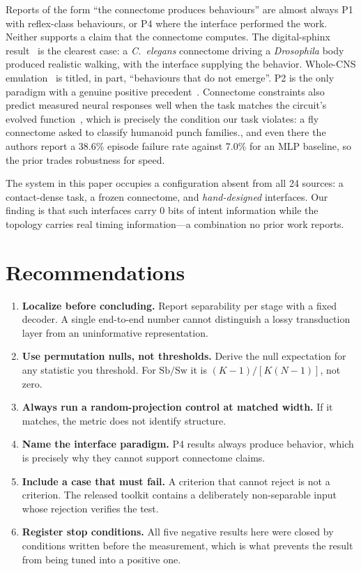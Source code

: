 \documentclass[11pt]{article}
\begin{document}
Reports of the form ``the connectome produces behaviours'' are almost always P1
with reflex-class behaviours, or P4 where the interface performed the work.
Neither supports a claim that the connectome computes.
The digital-sphinx result~\cite{digitalsphinx} is the clearest case: a
\emph{C.~elegans} connectome driving a \emph{Drosophila} body produced realistic
walking, with the interface supplying the behavior.
Whole-CNS emulation~\cite{wholecns} is titled, in part, ``behaviours that do not
emerge''. P2 is the only paradigm with a genuine positive
precedent~\cite{flycontrol}. Connectome constraints also predict measured neural
responses well when the task matches the circuit's evolved
function~\cite{flyvis}, which is precisely the condition our task violates: a fly
connectome asked to classify humanoid punch families., and even there the authors report a 38.6\% episode
failure rate against 7.0\% for an MLP baseline, so the prior trades robustness
for speed.

The system in this paper occupies a configuration absent from all 24 sources: a
contact-dense task, a frozen connectome, and \emph{hand-designed} interfaces. Our
finding is that such interfaces carry 0 bits of intent information while the
topology carries real timing information---a combination no prior work reports.

\section{Recommendations}

\begin{enumerate}
  \item \textbf{Localize before concluding.} Report separability per stage with a
        fixed decoder. A single end-to-end number cannot distinguish a lossy
        transduction layer from an uninformative representation.
  \item \textbf{Use permutation nulls, not thresholds.} Derive the null
        expectation for any statistic you threshold. For
        $\mathrm{Sb}/\mathrm{Sw}$ it is $(K{-}1)/[K(N{-}1)]$, not zero.
  \item \textbf{Always run a random-projection control at matched width.} If it
        matches, the metric does not identify structure.
  \item \textbf{Name the interface paradigm.} P4 results always produce behavior,
        which is precisely why they cannot support connectome claims.
  \item \textbf{Include a case that must fail.} A criterion that cannot reject is
        not a criterion. The released toolkit contains a deliberately
        non-separable input whose rejection verifies the test.
  \item \textbf{Register stop conditions.} All five negative results here were
        closed by conditions written before the measurement, which is what
        prevents the result from being tuned into a positive one.
\end{enumerate}
\end{document}
